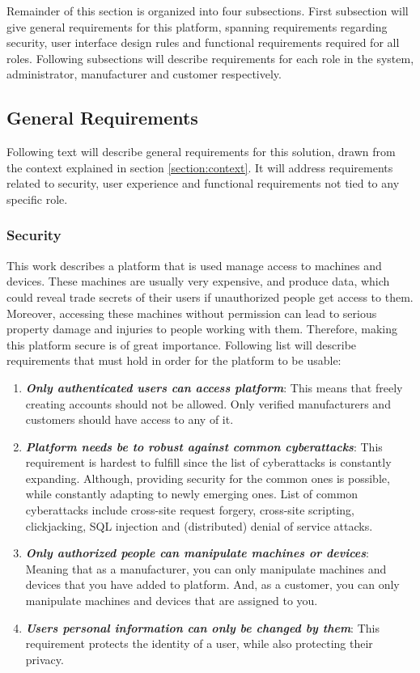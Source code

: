 Remainder of this section is organized into four subsections. First subsection will give general requirements for this platform, spanning requirements regarding security, user interface design rules and functional requirements required for all roles. Following subsections will describe requirements for each role in the system, administrator, manufacturer and customer respectively.    

\subsection{General Requirements}

Following text will describe general requirements for this solution, drawn from the context explained in section \ref{section:context}. It will address requirements related to security, user experience and functional requirements not tied to any specific role.

\subsubsection{Security}
\label{subsubsection:security}

This work describes a platform that is used manage access to machines and devices. These machines are usually very expensive, and produce data, which could reveal trade secrets of their users if unauthorized people get access to them. Moreover, accessing these machines without permission can lead to serious property damage and injuries to people working with them. Therefore, making this platform secure is of great importance. Following list will describe requirements that must hold in order for the platform to be usable:

\begin{enumerate}
	\setlength{\itemsep}{1pt}
	\item \textbf{\textit{Only authenticated users can access platform}}: This means that freely creating accounts should not be allowed. Only verified manufacturers and customers should have access to any of it.

	\item \textbf{\textit{Platform needs be to robust against common cyberattacks}}: This requirement is hardest to fulfill since the list of cyberattacks is constantly expanding. Although, providing security for the common ones is possible, while constantly adapting to newly emerging ones. List of common cyberattacks include cross-site request forgery, cross-site scripting, clickjacking, SQL injection and (distributed) denial of service attacks.

	\item \textbf{\textit{Only authorized people can manipulate machines or devices}}: Meaning that as a manufacturer, you can only manipulate machines and devices that you have added to platform. And, as a customer, you can only manipulate machines and devices that are assigned to you.

	\item \textbf{\textit{Users personal information can only be changed by them}}: This requirement protects the identity of a user, while also protecting their privacy. 
\end{enumerate}

